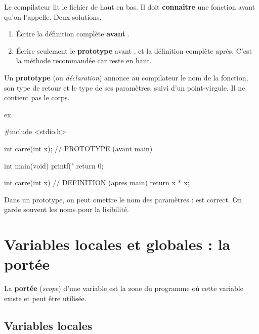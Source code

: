 Le compilateur lit le fichier de haut en bas. Il doit \textbf{connaître} une
fonction avant qu'on l'appelle. Deux solutions.

\begin{enumerate}[label=\arabic*)]
  \item Écrire la définition complète \textbf{avant} .
  \item Écrire seulement le \textbf{prototype} avant , et la définition
        complète après. C'est la méthode recommandée car  reste en haut.
\end{enumerate}

\begin{definition}
Un \textbf{prototype} (ou \emph{déclaration}) annonce au compilateur le nom de la
fonction, son type de retour et le type de ses paramètres, suivi d'un
point-virgule. Il ne contient pas le corps.
\end{definition}

\begin{syntaxe}
\quad ex.\quad {}
\end{syntaxe}

\begin{codec}
#include <stdio.h>

int carre(int x);        // PROTOTYPE (avant main)

int main(void) {
    printf("%
    return 0;
}

int carre(int x) {       // DEFINITION (apres main)
    return x * x;
}
\end{codec}

\begin{remarque}
Dans un prototype, on peut omettre le nom des paramètres :
 est correct. On garde souvent les noms pour la lisibilité.
\end{remarque}

\section{Variables locales et globales : la portée}

\begin{definition}
La \textbf{portée} (\emph{scope}) d'une variable est la zone du programme où cette
variable existe et peut être utilisée.
\end{definition}

\subsection{Variables locales}

